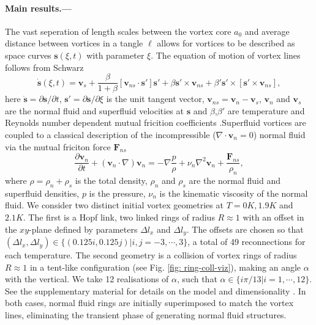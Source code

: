 \documentclass[%
 reprint,
 amsmath,amssymb,
 aps,
 prl,
]{revtex4-2}
\def \s{\mathbf{s}}
\def \v{\mathbf{v}}
\begin{document}
\paragraph*{Main results.---}The vast seperation of length scales between the vortex core $a_0$ and average distance between vortices in a tangle $\ell$ allows for vortices to be described as space curves $\s(\xi,t)$ with parameter $\xi$. The equation of motion of vortex lines follows from Schwarz \cite{schwarzThreedimensionalVortexDynamics1988a}
\begin{equation}
	\dot{\s}(\xi,t) = \v_s + \frac{\beta}{1+\beta}\left[\v_{ns}\cdot \s'\right]\s' + \beta\s'\times\v_{ns}+\beta'\s'\times\left[\s'\times \v_{ns}\right],
\end{equation}
here $\dot{\s}=\partial\s/\partial t$, $\s'=\partial\s/\partial \xi$ is the unit tangent vector, $\v_{ns}=\v_n - \v_s$, $\v_n$ and $\v_s$ are the normal fluid and superfluid velocities at $\s$ and $\beta$,$\beta'$ are temperature and Reynolds number dependent mutual fricition coefficients \cite{galantucciNewSelfconsistentApproach2020b}.Superfluid vortices are coupled to a classical description of the incompressible ($\nabla\cdot\v_n=0$) normal fluid via the mutual friciton force $\mathbf{F}_{ns}$
\begin{equation}
	\frac{\partial \v_n}{\partial t} + (\v_n\cdot\nabla)\v_n = -\nabla\frac{p}{\rho} + \nu_n\nabla^2\v_n + \frac{\mathbf{F}_{ns}}{\rho_n},
\end{equation}
where $\rho=\rho_n + \rho_s$ is the total density, $\rho_n$ and $\rho_s$ are the normal fluid and superfluid densities, $p$ is the pressure, $\nu_n$ is the kinematic viscosity of the normal fluid. We consider two distinct initial vortex geometries at $T=0K,1.9K$ and $2.1K$. The first is a Hopf link, two linked rings of radius $R\approx1$ with an offset in the $xy$-plane defined by parameters $\Delta l_x$ and $\Delta l_y$. The offsets are chosen so that $(\Delta l_x, \Delta l _y) \in \lbrace(0.125i,0.125j)|i,j=-3,\cdots,3 \rbrace$, a total of 49 reconnections for each temperature. The second geometry is a collision of vortex rings of radius $R\approx1$ in a tent-like configuration (see Fig. \ref{fig: ring-coll-viz}), making an angle $\alpha$ with the vertical. We take 12 realisations of $\alpha$, such that $\alpha\in\lbrace i\pi/13|i=1,\cdots,12\rbrace$. See the supplementary material for details on the model and dimensionality \cite{SeeSupplementaryMaterials}. In both cases, normal fluid rings are initially superimposed to match the vortex lines, eliminating the transient phase of generating normal fluid structures.
\end{document}
